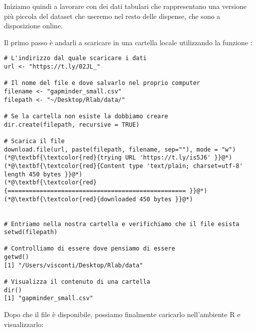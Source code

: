 \noindent Iniziamo quindi a lavorare con dei dati tabulari che rappresentano una versione pi\`u piccola del dataset che useremo nel resto delle dispense, che sono a disposizione online. 

\noindent Il primo passo \`e andarli a scaricare in una cartella locale utilizzando la funzione :

\begin{lstlisting}[style=Rstyle]
# L'indirizzo dal quale scaricare i dati
url <- "https://t.ly/02JL_"

# Il nome del file e dove salvarlo nel proprio computer
filename <- "gapminder_small.csv"
filepath <- "~/Desktop/Rlab/data/"

# Se la cartella non esiste la dobbiamo creare
dir.create(filepath, recursive = TRUE)

# Scarica il file
download.file(url, paste(filepath, filename, sep=""), mode = "w")
(*@\textbf{\textcolor{red}{trying URL 'https://t.ly/is5J6' }}@*)
(*@\textbf{\textcolor{red}{Content type 'text/plain; charset=utf-8' length 450 bytes }}@*)
(*@\textbf{\textcolor{red}{================================================== }}@*)
(*@\textbf{\textcolor{red}{downloaded 450 bytes }}@*)


# Entriamo nella nostra cartella e verifichiamo che il file esista
setwd(filepath)

# Controlliamo di essere dove pensiamo di essere
getwd()
[1] "/Users/visconti/Desktop/Rlab/data"

# Visualizza il contenuto di una cartella
dir()
[1] "gapminder_small.csv"
\end{lstlisting}



\noindent Dopo che il file \`e disponibile, possiamo finalmente caricarlo nell'ambiente R e visualizzarlo:

